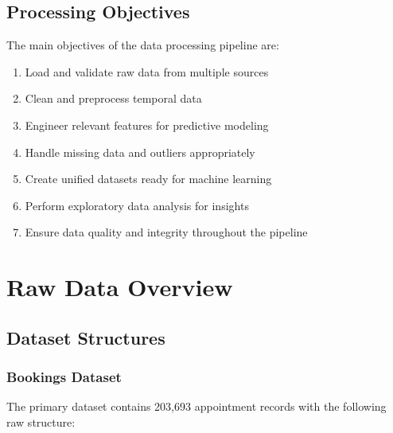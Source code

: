 \documentclass[12pt,a4paper]{article}
\begin{document}
\subsection{Processing Objectives}

The main objectives of the data processing pipeline are:

\begin{enumerate}
    \item Load and validate raw data from multiple sources
    \item Clean and preprocess temporal data
    \item Engineer relevant features for predictive modeling
    \item Handle missing data and outliers appropriately
    \item Create unified datasets ready for machine learning
    \item Perform exploratory data analysis for insights
    \item Ensure data quality and integrity throughout the pipeline
\end{enumerate}

\section{Raw Data Overview}

\subsection{Dataset Structures}

\subsubsection{Bookings Dataset}

The primary dataset contains 203,693 appointment records with the following raw structure:
\end{document}

